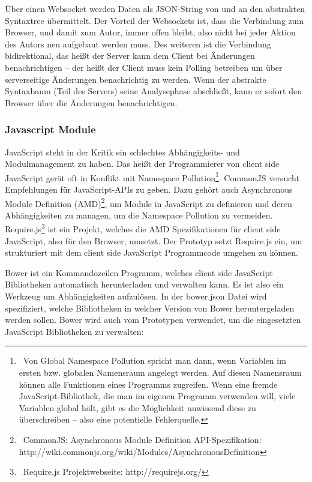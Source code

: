  
Über einen Websocket werden Daten als JSON-String von und an den abstrakten Syntaxtree übermittelt. Der Vorteil der Websockets ist, dass die Verbindung zum Browser, und damit zum Autor, immer offen bleibt, also nicht bei jeder Aktion des Autors neu aufgebaut werden muss. Des weiteren ist die Verbindung bidirektional, das heißt der Server kann dem Client bei Änderungen benachrichtigen -- der heißt der Client muss kein Polling betreiben um über serverseitige Änderungen benachrichtig zu werden. Wenn der abstrakte Syntaxbaum (Teil des Servers) seine Analysephase abschließt, kann er sofort den Browser über die Änderungen benachrichtigen.

 
\subsubsection{Javascript Module}\label{}

 
JavaScript steht in der Kritik ein schlechtes Abhängigkeits- und Modulmanagement zu haben. Das heißt der Programmierer von client side JavaScript gerät oft in Konflikt mit Namespace Pollution\footnote{~Von Global Namespace Pollution spricht man dann, wenn Variablen im ersten bzw. globalen Namensraum angelegt werden. Auf diesen Namensraum können alle Funktionen eines Programms zugreifen. Wenn eine fremde JavaScript-Bibliothek, die man im eigenen Programm verwenden will, viele Variablen global hält, gibt es die Möglichkeit unwissend diese zu überschreiben -- also eine potentielle Fehlerquelle.}. CommonJS versucht Empfehlungen für JavaScript-APIs zu geben. Dazu gehört auch Asynchronous Module Definition (AMD)\footnote{~CommonJS: Asynchronous Module Definition API-Spezifikation: http://wiki.commonjs.org/wiki/Modules/AsynchronousDefinition}, um Module in JavaScript zu definieren und deren Abhängigkeiten zu managen, um die Namespace Pollution zu vermeiden. Require.js\footnote{~Require.js Projektwebseite: http://requirejs.org/} ist ein Projekt, welches die AMD Spezifikationen für client side JavaScript, also für den Browser, umsetzt. Der Prototyp setzt Require.js ein, um strukturiert mit dem client side JavaScript Programmcode umgehen zu können.

 
Bower ist ein Kommandozeilen Programm, welches client side JavaScript Bibliotheken automatisch herunterladen und verwalten kann. Es ist also ein Werkzeug um Abhängigkeiten aufzulösen. In der bower.json Datei wird spezifiziert, welche Bibliotheken in welcher Version von Bower heruntergeladen werden sollen. Bower wird auch vom Prototypen verwendet, um die eingesetzten JavaScript Bibliotheken zu verwalten:

